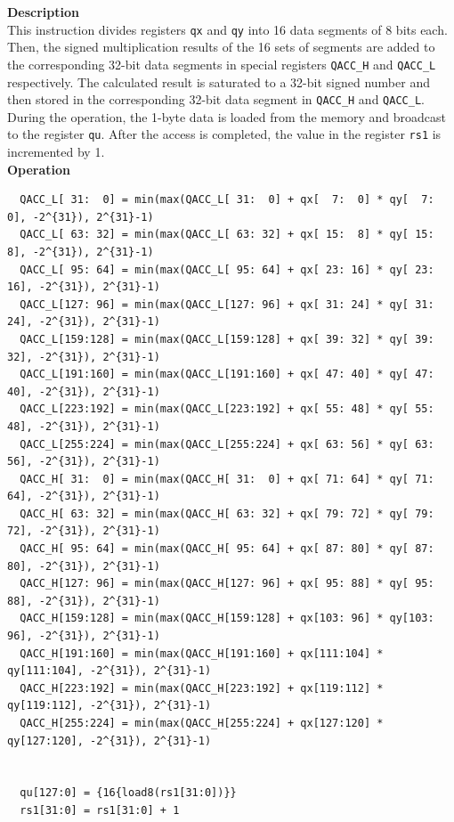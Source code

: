 \textbf{Description}\\
This instruction divides registers \lstinline{qx} and \lstinline{qy} into 16 data segments of 8 bits each. Then, the signed multiplication results of the 16 sets of segments are added to the corresponding 32-bit data segments in special registers \lstinline{QACC_H} and \lstinline{QACC_L} respectively. The calculated result is saturated to a 32-bit signed number and then stored in the corresponding 32-bit data segment in \lstinline{QACC_H} and \lstinline{QACC_L}.\\
During the operation, the 1-byte data is loaded from the memory and broadcast to the register \lstinline{qu}. After the access is completed, the value in the register \lstinline{rs1} is incremented by 1.\\
\textbf{Operation}
\begin{lstlisting}
  QACC_L[ 31:  0] = min(max(QACC_L[ 31:  0] + qx[  7:  0] * qy[  7:  0], -2^{31}), 2^{31}-1)
  QACC_L[ 63: 32] = min(max(QACC_L[ 63: 32] + qx[ 15:  8] * qy[ 15:  8], -2^{31}), 2^{31}-1)
  QACC_L[ 95: 64] = min(max(QACC_L[ 95: 64] + qx[ 23: 16] * qy[ 23: 16], -2^{31}), 2^{31}-1)
  QACC_L[127: 96] = min(max(QACC_L[127: 96] + qx[ 31: 24] * qy[ 31: 24], -2^{31}), 2^{31}-1)
  QACC_L[159:128] = min(max(QACC_L[159:128] + qx[ 39: 32] * qy[ 39: 32], -2^{31}), 2^{31}-1)
  QACC_L[191:160] = min(max(QACC_L[191:160] + qx[ 47: 40] * qy[ 47: 40], -2^{31}), 2^{31}-1)
  QACC_L[223:192] = min(max(QACC_L[223:192] + qx[ 55: 48] * qy[ 55: 48], -2^{31}), 2^{31}-1)
  QACC_L[255:224] = min(max(QACC_L[255:224] + qx[ 63: 56] * qy[ 63: 56], -2^{31}), 2^{31}-1)
  QACC_H[ 31:  0] = min(max(QACC_H[ 31:  0] + qx[ 71: 64] * qy[ 71: 64], -2^{31}), 2^{31}-1)
  QACC_H[ 63: 32] = min(max(QACC_H[ 63: 32] + qx[ 79: 72] * qy[ 79: 72], -2^{31}), 2^{31}-1)
  QACC_H[ 95: 64] = min(max(QACC_H[ 95: 64] + qx[ 87: 80] * qy[ 87: 80], -2^{31}), 2^{31}-1)
  QACC_H[127: 96] = min(max(QACC_H[127: 96] + qx[ 95: 88] * qy[ 95: 88], -2^{31}), 2^{31}-1)
  QACC_H[159:128] = min(max(QACC_H[159:128] + qx[103: 96] * qy[103: 96], -2^{31}), 2^{31}-1)
  QACC_H[191:160] = min(max(QACC_H[191:160] + qx[111:104] * qy[111:104], -2^{31}), 2^{31}-1)
  QACC_H[223:192] = min(max(QACC_H[223:192] + qx[119:112] * qy[119:112], -2^{31}), 2^{31}-1)
  QACC_H[255:224] = min(max(QACC_H[255:224] + qx[127:120] * qy[127:120], -2^{31}), 2^{31}-1)


  qu[127:0] = {16{load8(rs1[31:0])}}
  rs1[31:0] = rs1[31:0] + 1
\end{lstlisting}

